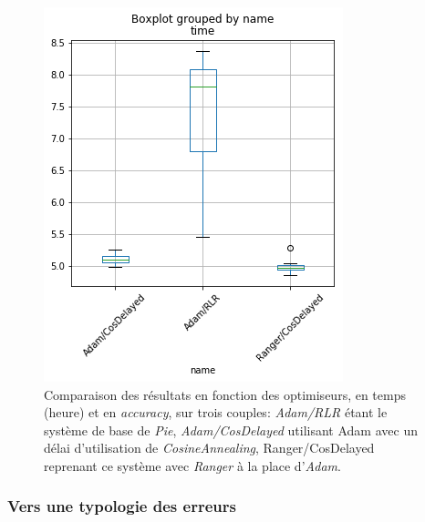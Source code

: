 \begin{figure}[ht]
\begin{minipage}[c]{0.55\linewidth}
        \includegraphics[width=1\linewidth]{results/lemmatisation/entrainement/boxplot_time_ranger.png}
    \end{minipage}
    \caption{Comparaison des résultats en fonction des optimiseurs, en temps (heure) et en \textit{accuracy}, sur trois couples: \textit{Adam/RLR} étant le système de base de \textit{Pie}, \textit{Adam/CosDelayed} utilisant Adam avec un délai d'utilisation de \textit{CosineAnnealing}, Ranger/CosDelayed reprenant ce système avec \textit{Ranger} à la place d'\textit{Adam}. }
    \label{fig:lemmatisation:optimiseur:ranger}
\end{figure}

\subsubsection{Vers une typologie des erreurs}

